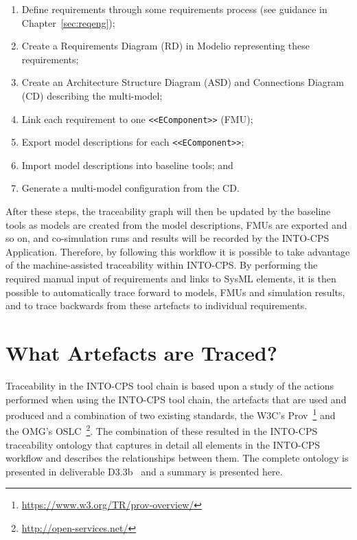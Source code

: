 \begin{enumerate}[noitemsep]
  \item Define requirements through some requirements process (see guidance in Chapter~\ref{sec:reqeng});
  \item Create a Requirements Diagram (RD) in Modelio representing these requirements;
  \item Create an Architecture Structure Diagram (ASD) and Connections Diagram (CD) describing the multi-model;
  \item Link each requirement to one \texttt{<<EComponent>>} (FMU);
  \item Export model descriptions for each \texttt{<<EComponent>>};
  \item Import model descriptions into baseline tools; and
  \item Generate a multi-model configuration from the CD.
\end{enumerate}

After these steps, the traceability graph will then be updated by the baseline tools as models are created from the model descriptions, FMUs are exported and so on, and co-simulation runs and results will be recorded by the INTO-CPS Application. Therefore, by following this workflow it is possible to take advantage of the machine-assisted traceability within INTO-CPS. By performing the required manual input of requirements and links to SysML elements, it is then possible to automatically trace forward to models, FMUs and simulation results, and to trace backwards from these artefacts to individual requirements.

\section{What Artefacts are Traced?}



Traceability in the INTO-CPS tool chain is based upon a study of the actions performed when using the INTO-CPS tool chain, the artefacts that are used and produced and a combination of two existing standards, the W3C's Prov~\footnote{\url{https://www.w3.org/TR/prov-overview/}} and the OMG's OSLC~\footnote{\url{http://open-services.net/}}.   The combination of these resulted in the INTO-CPS traceability ontology that captures in detail all elements in the INTO-CPS workflow and describes the relationships between them.  The complete ontology is presented in deliverable D3.3b~\cite{INTOCPSD3.3b} and a summary is presented here.

